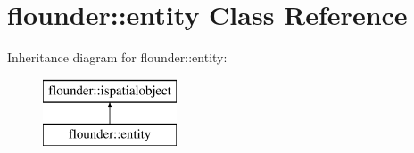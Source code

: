 \hypertarget{classflounder_1_1entity}{}\section{flounder\+:\+:entity Class Reference}
\label{classflounder_1_1entity}
Inheritance diagram for flounder\+:\+:entity\+:\begin{figure}[H]
\begin{center}
\leavevmode
\includegraphics[height=2.000000cm]{classflounder_1_1entity}
\end{center}
\end{figure}
